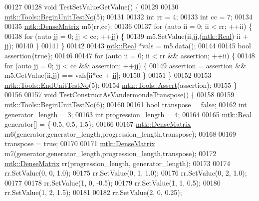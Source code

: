 \begin{DoxyCode}
00127 
00128 \textcolor{keywordtype}{void} TestSetValueGetValue() \{
00129 
00130   \hyperlink{classmtk_1_1Tools_a26ee906d28523378522a75e25c3a4e19}{mtk::Tools::BeginUnitTestNo}(5);
00131 
00132   \textcolor{keywordtype}{int} rr = 4;
00133   \textcolor{keywordtype}{int} cc = 7;
00134 
00135   \hyperlink{classmtk_1_1DenseMatrix}{mtk::DenseMatrix} m5(rr,cc);
00136 
00137   \textcolor{keywordflow}{for} (\textcolor{keyword}{auto} ii = 0; ii < rr; ++ii) \{
00138     \textcolor{keywordflow}{for} (\textcolor{keyword}{auto} jj = 0; jj < cc; ++jj) \{
00139       m5.SetValue(ii,jj,(\hyperlink{group__c01-roots_gac080bbbf5cbb5502c9f00405f894857d}{mtk::Real}) ii + jj);
00140     \}
00141   \}
00142 
00143   \hyperlink{group__c01-roots_gac080bbbf5cbb5502c9f00405f894857d}{mtk::Real} *vals = m5.data();
00144 
00145   \textcolor{keywordtype}{bool} assertion\{\textcolor{keyword}{true}\};
00146 
00147   \textcolor{keywordflow}{for} (\textcolor{keyword}{auto} ii = 0; ii < rr && assertion; ++ii) \{
00148     \textcolor{keywordflow}{for} (\textcolor{keyword}{auto} jj = 0; jj < cc  && assertion; ++jj) \{
00149       assertion = assertion && m5.GetValue(ii,jj) == vals[ii*cc + jj];
00150     \}
00151   \}
00152 
00153   \hyperlink{classmtk_1_1Tools_ad8cf0085133dd40c913fe195bc5b9694}{mtk::Tools::EndUnitTestNo}(5);
00154   \hyperlink{classmtk_1_1Tools_aa311fada9255627d06c56b1e4fedce9e}{mtk::Tools::Assert}(assertion);
00155 \}
00156 
00157 \textcolor{keywordtype}{void} TestConstructAsVandermondeTranspose() \{
00158 
00159   \hyperlink{classmtk_1_1Tools_a26ee906d28523378522a75e25c3a4e19}{mtk::Tools::BeginUnitTestNo}(6);
00160 
00161   \textcolor{keywordtype}{bool} transpose = \textcolor{keyword}{false};
00162   \textcolor{keywordtype}{int} generator\_length = 3;
00163   \textcolor{keywordtype}{int} progression\_length = 4;
00164 
00165   \hyperlink{group__c01-roots_gac080bbbf5cbb5502c9f00405f894857d}{mtk::Real} generator[] = \{-0.5, 0.5, 1.5\};
00166 
00167   \hyperlink{classmtk_1_1DenseMatrix}{mtk::DenseMatrix} m6(generator,generator\_length,progression\_length,transpose);
00168 
00169   transpose = \textcolor{keyword}{true};
00170 
00171   \hyperlink{classmtk_1_1DenseMatrix}{mtk::DenseMatrix} m7(generator,generator\_length,progression\_length,transpose);
00172   \hyperlink{classmtk_1_1DenseMatrix}{mtk::DenseMatrix} rr(progression\_length, generator\_length);
00173 
00174   rr.SetValue(0, 0, 1.0);
00175   rr.SetValue(0, 1, 1.0);
00176   rr.SetValue(0, 2, 1.0);
00177 
00178   rr.SetValue(1, 0, -0.5);
00179   rr.SetValue(1, 1, 0.5);
00180   rr.SetValue(1, 2, 1.5);
00181 
00182   rr.SetValue(2, 0, 0.25);

\end{DoxyCode}
